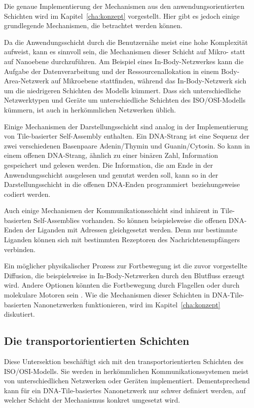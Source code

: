Die genaue Implementierung der Mechanismen aus den anwendungsorientierten Schichten wird im Kapitel~\ref{cha:konzept} vorgestellt. Hier gibt es jedoch einige grundlegende Mechanismen, die betrachtet werden können.

Da die Anwendungsschicht durch die Benutzernähe meist eine hohe Komplexität aufweist, kann es sinnvoll sein, die Mechanismen dieser Schicht auf Mikro- statt auf Nanoebene durchzuführen. 
Am Beispiel eines In-Body-Netzwerkes kann die Aufgabe der Datenverarbeitung und der Ressourcenallokation in einem Body-Area-Netzwerk auf Mikroebene stattfinden, während das In-Body-Netzwerk sich um die niedrigeren Schichten des Modells kümmert. Dass sich unterschiedliche Netzwerktypen und Geräte um unterschiedliche Schichten des ISO/OSI-Modells kümmern, ist auch in herkömmlichen Netzwerken üblich.\cite{osi-model}

Einige Mechanismen der Darstellungsschicht sind analog in der Implementierung von Tile-basierter Self-Assembly 
enthalten. 
Ein DNA-Strang ist eine Sequenz der zwei verschiedenen Basenpaare Adenin/Thymin und Guanin/Cytosin.
So kann in einem offenen DNA-Strang, ähnlich zu einer binären Zahl, Information gespeichert und gelesen werden. Die Information, die am Ende in der Anwendungsschicht ausgelesen und genutzt werden soll, kann so in der Darstellungsschicht in die offenen DNA-Enden \glqq programmiert\grqq\, beziehungsweise codiert werden.

Auch einige Mechanismen der Kommunikationsschicht sind inhärent in Tile-basierten Self-Assemblies vorhanden. So können beispielsweise die offenen DNA-Enden der Liganden mit Adressen gleichgesetzt werden. Denn nur bestimmte Liganden können sich mit bestimmten Rezeptoren des Nachrichtenempfängers verbinden.

Ein möglicher physikalischer Prozess zur Fortbewegung ist die zuvor vorgestellte Diffusion, die beispielsweise in In-Body-Netzwerken durch den Blutfluss erzeugt wird. Andere Optionen könnten die Fortbewegung durch Flagellen oder durch molekulare Motoren sein \cite{lau2020phd}.
Wie die Mechanismen dieser Schichten in DNA-Tile-basierten Nanonetzwerken funktionieren, wird im Kapitel~\ref{cha:konzept} diskutiert. 

\subsection{Die transportorientierten Schichten}

Diese Untersektion beschäftigt sich mit den transportorientierten Schichten des ISO/OSI-Modells. Sie werden in herkömmlichen Kommunikationssystemen meist von unterschiedlichen Netzwerken oder Geräten implementiert. Dementsprechend kann für ein DNA-Tile-basiertes Nanonetzwerk nur schwer definiert werden, auf welcher Schicht der Mechanismus konkret umgesetzt wird.


